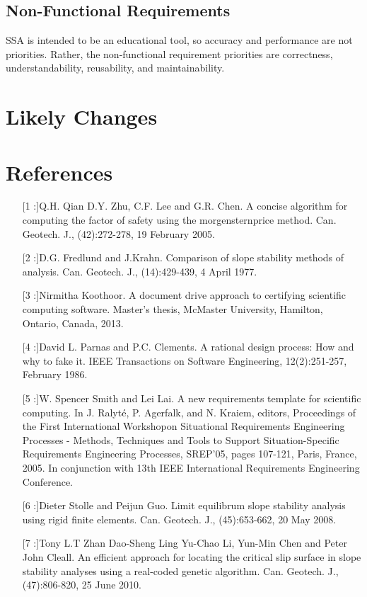 \documentclass[12pt]{article}
\begin{document}
\subsection{Non-Functional Requirements}
\label{Sec:Non-Requ}
SSA is intended to be an educational tool, so accuracy and performance are not priorities. Rather, the non-functional requirement priorities are correctness, understandability, reusability, and maintainability.
\section{Likely Changes}
\label{Sec:LikeChan}
\section{References}
\label{Sec:Refe}
\begin{itemize}
\item[[1]:]Q.H. Qian D.Y. Zhu, C.F. Lee and G.R. Chen. A concise algorithm for computing the factor of safety using the morgensternprice method. Can. Geotech. J., (42):272-278, 19 February 2005.
\item[[2]:]D.G. Fredlund and J.Krahn. Comparison of slope stability methods of analysis. Can. Geotech. J., (14):429-439, 4 April 1977.
\item[[3]:]Nirmitha Koothoor. A document drive approach to certifying scientific computing software. Master's thesis, McMaster University, Hamilton, Ontario, Canada, 2013.
\item[[4]:]David L. Parnas and P.C. Clements. A rational design process: How and why to fake it. IEEE Transactions on Software Engineering, 12(2):251-257, February 1986.
\item[[5]:]W. Spencer Smith and Lei Lai. A new requirements template for scientific computing. In J. Ralyt\'{e}, P. Agerfalk, and N. Kraiem, editors, Proceedings of the First International Workshopon Situational Requirements Engineering Processes - Methods, Techniques and Tools to Support Situation-Specific Requirements Engineering Processes, SREP'05, pages 107-121, Paris, France, 2005. In conjunction with 13th IEEE International Requirements Engineering Conference.
\item[[6]:]Dieter Stolle and Peijun Guo. Limit equilibrum slope stability analysis using rigid finite elements. Can. Geotech. J., (45):653-662, 20 May 2008.
\item[[7]:]Tony L.T Zhan Dao-Sheng Ling Yu-Chao Li, Yun-Min Chen and Peter John Cleall. An efficient approach for locating the critical slip surface in slope stability analyses using a real-coded genetic algorithm. Can. Geotech. J., (47):806-820, 25 June 2010.
\end{itemize}
\end{document}
